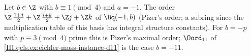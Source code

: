 Let $b\in\Z$ with $b\equiv1\pmod4$ and $a=-1$. The order $\Z\,\tfrac{1+j}2+\Z\,\tfrac{i+k}2+\Z j+\Z k$ of $\Bq(-1,b)$ (Pizer's order; a subring since the
multiplication table of this basis has integral structure constants). For $b=-p$ with $p\equiv3\pmod4$ prime this is Pizer's maximal order; $\Oord_{11}$ of
\cref{III.qcls.ex:eichler-mass-instance-d11} is the case $b=-11$.
